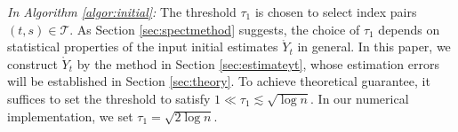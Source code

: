 \documentclass[12pt]{article}
\newcommand{\blue}[1]{\textcolor{blue}{#1}}
\newcommand{\EXPT}{\mathbb{E}}
\newcommand{\mytrans}{\top}
\newcommand{\Seff}{S_{eff} }
\newcommand{\Ieff}{I_{eff} }
\begin{document}


	













  \emph{In Algorithm \ref{algor:initial}:} The threshold $\tau_1$ is chosen to select index pairs $(t,s)\in \mathcal{T}$. 
As Section \ref{sec:spectmethod} suggests,  the choice of $\tau_1$ depends on statistical properties of the input initial estimates $\mathring{Y}_t$ in general.   
 In this paper, we construct $\mathring{Y}_t$ by the method in Section \ref{sec:estimateyt}, whose estimation errors will be established in Section \ref{sec:theory}. 
 To achieve theoretical guarantee, it suffices to set the threshold to satisfy $1 \ll \tau_1 \lesssim \sqrt{\log n}$.  In our numerical implementation, we set $\tau_1 = \sqrt{2 \log n}$.
\end{document}

